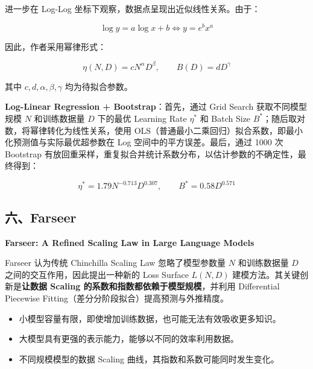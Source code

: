 \documentclass[
  11pt,
  a4paper,
  fontset=none]{ctexart}
\providecommand{\tightlist}{%
  \setlength{\itemsep}{0pt}\setlength{\parskip}{0pt}}
\newenvironment{NotesFormula}{%
  \par\noindent\begin{minipage}{\linewidth}%
  \setlength{\parindent}{2em}%
  \setlength{\parskip}{0.35em}%
}{\end{minipage}\par}
\begin{document}
\begin{NotesFormula}

进一步在 Log-Log 坐标下观察，数据点呈现出近似线性关系。由于：

\[\log y=a\log x+b\iff y=e^bx^a\]

\end{NotesFormula}

\begin{NotesFormula}

因此，作者采用幂律形式：

\[\boxed{\eta(N,D)=cN^\alpha D^\beta},\qquad
\boxed{B(D)=dD^\gamma}\]

\end{NotesFormula}

其中 \(c,d,\alpha,\beta,\gamma\) 均为待拟合参数。

\begin{NotesFormula}

\textbf{Log-Linear Regression + Bootstrap}：首先，通过 Grid Search
获取不同模型规模 \(N\) 和训练数据量 \(D\) 下的最优 Learning Rate
\(\eta^*\) 和 Batch Size \(B^*\)；随后取对数，将幂律转化为线性关系，使用
OLS（普通最小二乘回归）拟合系数，即最小化预测值与实际最优超参数在 Log
空间中的平方误差。最后，通过 1000 次 Bootstrap
有放回重采样，重复拟合并统计系数分布，以估计参数的不确定性，最终得到：

\[\boxed{\eta^*=1.79N^{-0.713}D^{0.307},\qquad B^*=0.58D^{0.571}}\]

\end{NotesFormula}

\clearpage

\subsection{六、Farseer}\label{ux516dfarseer}

\textbf{Farseer: A Refined Scaling Law in Large Language Models}

Farseer 认为传统 Chinchilla Scaling Law 忽略了模型参数量 \(N\)
和训练数据量 \(D\) 之间的交互作用，因此提出一种新的 Loss Surface
\(L(N,D)\) 建模方法。其关键创新是\textbf{让数据 Scaling
的系数和指数都依赖于模型规模}，并利用 Differential Piecewise
Fitting（差分分阶段拟合）提高预测与外推精度。

\begin{itemize}
\tightlist
\item
  小模型容量有限，即使增加训练数据，也可能无法有效吸收更多知识。
\item
  大模型具有更强的表示能力，能够以不同的效率利用数据。
\item
  不同规模模型的数据 Scaling 曲线，其指数和系数可能同时发生变化。
\end{itemize}
\end{document}
